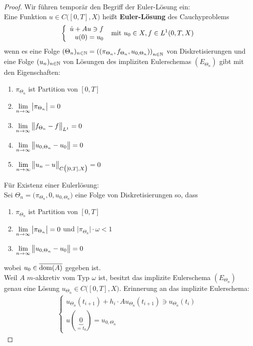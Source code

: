 \begin{proof}
	Wir führen temporär den Begriff der Euler-Lösung ein:\\
	Eine Funktion $u\in C\big([0,T],X\big)$ heißt \textbf{Euler-Lösung} des Cauchyproblems 
	\begin{align*}
		\left\lbrace\begin{array}{rl}
			\dot{u}+Au\ni f\\
			u(0)=u_0
		\end{array}\right.\mit u_0\in X,f\in L^1(0,T,X)
	\end{align*}
	wenn es eine Folge 
	$(\Theta_n)_{n\in\N}=\left(\left(\pi_{\Theta_n},f_{\Theta_n},u_{0,\Theta_n}\right)\right)_{n\in\N}$ 
	von Diskretisierungen und eine Folge $(u_n)_{n\in\N}$ von Lösungen des impliziten Eulerschemas $(E_{\Theta_n})$ gibt mit den Eigenschaften:
	\begin{enumerate}
		\item $\pi_{\Theta_n}$ ist Partition von $[0,T]$
		\item $\limn\big|\pi_{\Theta_n}\big|=0$
		\item $\limn\big\Vert f_{\Theta_n}-f\big\Vert_{L^1}=0$
		\item $\limn\big\Vert u_{0,\Theta_n}-u_0\big\Vert=0$
		\item $\limn\big\Vert u_n-u\big\Vert_{C\big([0,T],X\big)}=0$
	\end{enumerate}
	Für Existenz einer Eulerlösung:\\
	Sei $\Theta_n=\big(\pi_{\Theta_n},0,u_{0,\Theta_n}\big)$ eine Folge von Diskretisierungen so, dass 
	\begin{enumerate}
		\item $\pi_{\Theta_n}$ ist Partition von $[0,T]$
		\item $\limn\big|\pi_{\Theta_n}\big|=0$ und $\big|\pi_{\Theta_n}\big|\cdot\omega<1$
		\item $\limn\big\Vert u_{0,\Theta_n}-u_0\big\Vert=0$
	\end{enumerate}
	wobei $u_0\in\overline{\dom(A)}$ gegeben ist.\\
	Weil $A$ $m$-akkretiv vom Typ $\omega$ ist, besitzt das implizite Eulerschema $(E_{\Theta_n})$ genau eine Lösung 
	$u_{\Theta_n}\in C\big([0,T],X\big)$. Erinnerung an das implizite Eulerschema:
	\begin{align*}
		\left\lbrace\begin{array}{c}
			u_{\Theta_n}(t_{i+1})+h_i\cdot A u_{\Theta_n}(t_{i+1})\ni u_{\Theta_n}(t_i)\\
			u(\underbrace{0}_{=t_0})=u_{0,\Theta_n}

\end{array}
\end{align*}
\end{proof}

